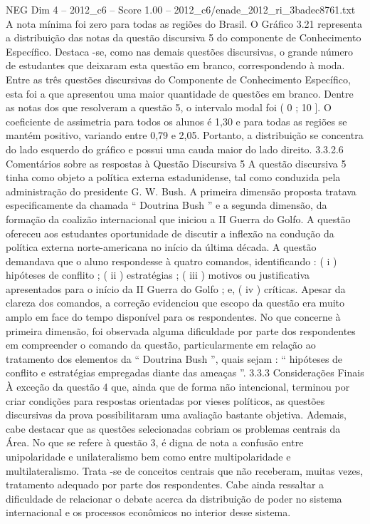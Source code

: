 \begin{textsample}{NEG Dim 4 – 2012\_c6 – Score 1.00 – 2012\_c6/enade\_2012\_ri\_3badec8761.txt}
A nota mínima foi zero para todas as regiões do Brasil.
O Gráfico 3.21 representa a distribuição das notas da questão discursiva 5 do componente de Conhecimento Específico.
Destaca -se, como nas demais questões discursivas, o grande número de estudantes que deixaram esta questão em branco, correspondendo à moda.
Entre as três questões discursivas do Componente de Conhecimento Específico, esta foi a que apresentou uma maior quantidade de questões em branco.
Dentre as notas dos que resolveram a questão 5, o intervalo modal foi ( 0 ; 10 ].
O coeficiente de assimetria para todos os alunos é 1,30 e para todas as regiões se mantém positivo, variando entre 0,79 e 2,05.
Portanto, a distribuição se concentra do lado esquerdo do gráfico e possui uma cauda maior do lado direito. 3.3.2.6 Comentários sobre as respostas à Questão Discursiva 5 A questão discursiva 5 tinha como objeto a política externa estadunidense, tal como conduzida pela administração do presidente G.
W.
Bush.
A primeira dimensão proposta tratava especificamente da chamada “ Doutrina Bush ” e a segunda dimensão, da formação da coalizão internacional que iniciou a II Guerra do Golfo.
A questão ofereceu aos estudantes oportunidade de discutir a inflexão na condução da política externa norte-americana no início da última década.
A questão demandava que o aluno respondesse à quatro comandos, identificando : ( i ) hipóteses de conflito ; ( ii ) estratégias ; ( iii ) motivos ou justificativa apresentados para o início da II Guerra do Golfo ; e, ( iv ) críticas.
Apesar da clareza dos comandos, a correção evidenciou que escopo da questão era muito amplo em face do tempo disponível para os respondentes.
No que concerne à primeira dimensão, foi observada alguma dificuldade por parte dos respondentes em compreender o comando da questão, particularmente em relação ao tratamento dos elementos da “ Doutrina Bush ”, quais sejam : “ hipóteses de conflito e estratégias empregadas diante das ameaças ”. 3.3.3 Considerações Finais À exceção da questão 4 que, ainda que de forma não intencional, terminou por criar condições para respostas orientadas por vieses políticos, as questões discursivas da prova possibilitaram uma avaliação bastante objetiva.
Ademais, cabe destacar que as questões selecionadas cobriam os problemas centrais da Área.
No que se refere à questão 3, é digna de nota a confusão entre unipolaridade e unilateralismo bem como entre multipolaridade e multilateralismo.
Trata -se de conceitos centrais que não receberam, muitas vezes, tratamento adequado por parte dos respondentes.
Cabe ainda ressaltar a dificuldade de relacionar o debate acerca da distribuição de poder no sistema internacional e os processos econômicos no interior desse sistema.

\end{textsample}
